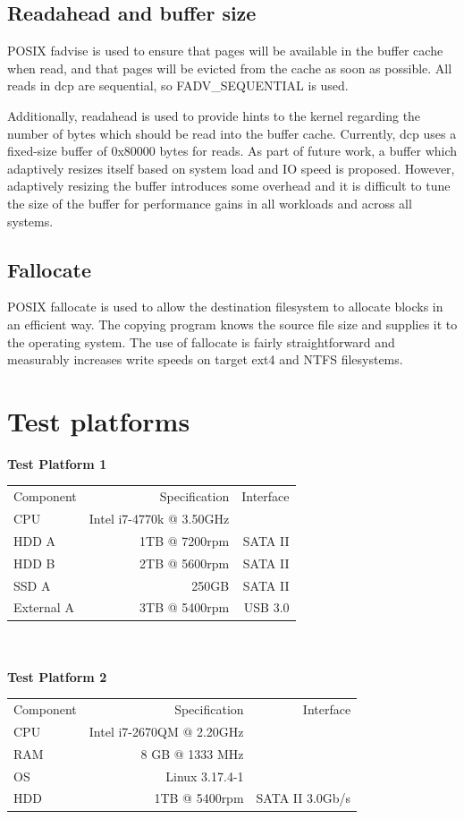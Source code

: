\documentclass[12pt]{article}
\begin{document}
\subsection{Readahead and buffer size}
POSIX fadvise is used to ensure that pages will be available
in the buffer cache when read, and that pages will be evicted from
the cache as soon as possible. All reads in dcp are
sequential, so FADV\_SEQUENTIAL is used.

Additionally, readahead is used to provide hints to the kernel
regarding the number of bytes which should be read into the buffer cache.
Currently, dcp uses a fixed-size buffer of 0x80000 bytes for reads.
As part of future work, a buffer which adaptively resizes itself based on system
load and IO speed is proposed. However, adaptively resizing the buffer introduces
some overhead and it is difficult to tune the size of the buffer for performance gains
in all workloads and across all systems. %

\subsection{Fallocate}
POSIX fallocate is used to allow the destination filesystem to
allocate blocks in an efficient way. The copying program knows
the source file size and supplies it to the operating system.
The use of fallocate is fairly straightforward and measurably
increases write speeds on target ext4 and NTFS filesystems.

\section {Test platforms}
\textbf{Test Platform 1}\\
\begin{tabular}{|l|r r|}
  \hline
  Component & Specification                   & Interface \\
  CPU       & Intel i7-4770k @ 3.50GHz        &           \\
  HDD A     &         1TB @ 7200rpm           & SATA II   \\
  HDD B     &                 2TB @ 5600rpm   & SATA II   \\
  SSD A     &         250GB                   & SATA II   \\
  External A& 3TB @ 5400rpm                   & USB 3.0   \\
  \hline
\end{tabular}\\\\
\textbf{Test Platform 2}\\
\begin{tabular}{|l|r r|}
  \hline
  Component & Specification                   & Interface \\
  CPU       & Intel i7-2670QM @ 2.20GHz       &           \\
  RAM       & 8 GB @ 1333 MHz                 &           \\
  OS        & Linux 3.17.4-1                  &           \\
  HDD       & 1TB @ 5400rpm                   & SATA II 3.0Gb/s  \\
  \hline
\end{tabular}
\end{document}
